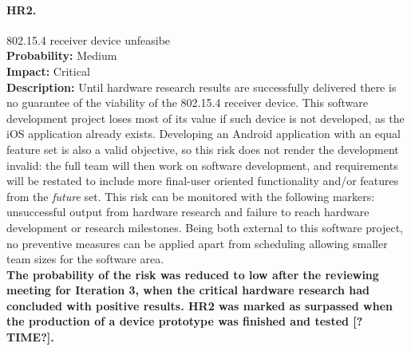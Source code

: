 		\paragraph{HR2.}802.15.4 receiver device unfeasibe\\
		\textbf{Probability:} Medium\\
		\textbf{Impact:} Critical\\
		\textbf{Description:} Until hardware research results are successfully delivered there is no guarantee of the viability of the 802.15.4 receiver device. This software development project loses most of its value if such device is not developed, as the iOS application already exists. Developing an Android application with an equal feature set is also a valid objective, so this risk does not render the development invalid: the full team will then work on software development, and requirements will be restated to include more final-user oriented functionality and/or features from the \emph{future} set.
		This risk can be monitored with the following markers: unsuccessful output from hardware research and failure to reach hardware development or research milestones. Being both external to this software project, no preventive measures can be applied apart from scheduling allowing smaller team sizes for the software area.\\
		\textbf{The probability of the risk was reduced to low after the reviewing meeting for Iteration 3, when the critical hardware research had concluded with positive results. HR2 was marked as surpassed when the production of a device prototype was finished and tested [?TIME?].}

